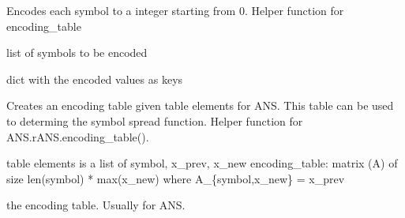 \documentclass[letterpaper,10pt,english]{sphinxmanual}
\begin{document}

\begin{fulllineitems}
\label{\detokenize{utils:utils.utils.encode_symbols_to_integer}}
\pysigstartsignatures
{}
\pysigstopsignatures
\sphinxAtStartPar
Encodes each symbol to a integer starting from 0. Helper function for encoding\_table
\begin{description}
\begin{description}
\sphinxAtStartPar
list of symbols to be encoded

\end{description}

\begin{description}
\sphinxAtStartPar
dict with the encoded values as keys

\end{description}

\end{description}

\end{fulllineitems}


\begin{fulllineitems}
\label{\detokenize{utils:utils.utils.encoding_table}}
\pysigstartsignatures
{}
\pysigstopsignatures
\sphinxAtStartPar
Creates an encoding table given table elements for ANS. This table can be used to determing the symbol spread function. Helper function for ANS.rANS.encoding\_table().
\begin{description}
\begin{description}
\sphinxAtStartPar
table elements is a list of symbol, x\_prev, x\_new
encoding\_table: matrix (A) of size len(symbol) * max(x\_new) where A\_\{symbol,x\_new\} = x\_prev

\end{description}

\begin{description}
\sphinxAtStartPar
the encoding table. Usually for ANS.

\end{description}

\end{description}

\end{fulllineitems}
\end{document}
